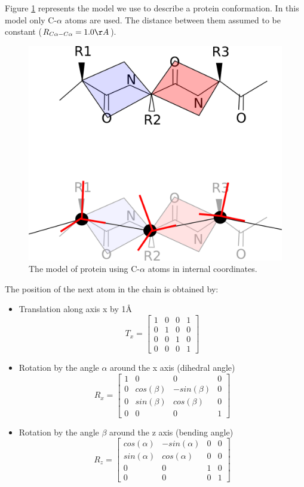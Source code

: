 
Figure \ref{Fig:proteinModelCalpha} represents the model we use to describe a protein conformation. In this 
model only C-$\alpha$ atoms are used. The distance between them assumed to be constant ($R_{C\alpha - C\alpha}=1.0\AA$).

\begin{figure}[H]
    \centering
    \includegraphics[width=\linewidth]{Fig/amide_planes.png}
    \caption{The model of protein using C-$\alpha$ atoms in internal coordinates.}
    \label{Fig:proteinModelCalpha}
\end{figure}

The position of the next atom in the chain is obtained by:
\begin{itemize}
\item Translation along axis x by 1\AA 
$$
T_x = \begin{bmatrix}
1 & 0 & 0 & 1 \\
0 & 1 & 0 & 0 \\
0 & 0 & 1 & 0 \\
0 & 0 & 0 & 1
\end{bmatrix} 
$$
\item Rotation by the angle $\alpha$ around the x axis (dihedral angle)
$$
R_x = \begin{bmatrix}
1 & 0 & 0 & 0 \\
0 & cos(\beta) & -sin(\beta) & 0 \\
0 & sin(\beta) & cos(\beta) & 0 \\
0 & 0 & 0 & 1
\end{bmatrix} 
$$
\item Rotation by the angle $\beta$ around the z axis (bending angle)
$$
R_z = \begin{bmatrix}
cos(\alpha) & -sin(\alpha) & 0 & 0 \\
sin(\alpha) & cos(\alpha) & 0 & 0 \\
0 & 0 & 1 & 0 \\
0 & 0 & 0 & 1
\end{bmatrix} 
$$

\end{itemize}

